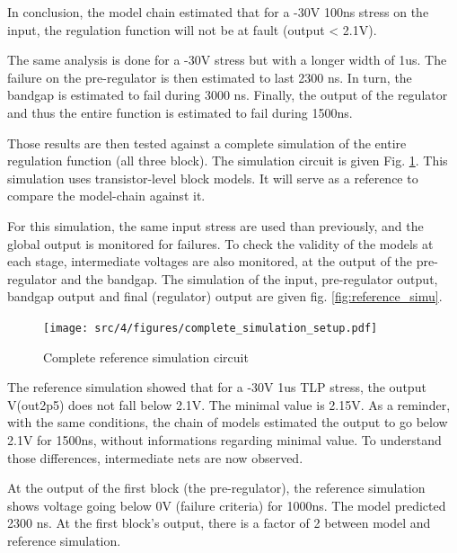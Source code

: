 In conclusion, the model chain estimated that for a -30V 100ns stress on the input, the regulation function will not be at fault (output < 2.1V).

The same analysis is done for a -30V stress but with a longer width of 1us.
The failure on the pre-regulator is then estimated to last 2300 ns.
In turn, the bandgap is estimated to fail during 3000 ns.
Finally, the output of the regulator and thus the entire function is estimated to fail during 1500ns.

Those results are then tested against a complete simulation of the entire regulation function (all three block).
The simulation circuit is given Fig. \ref{fig:reference_simu_circuit}.
This simulation uses transistor-level block models.
It will serve as a reference to compare the model-chain against it.

For this simulation, the same input stress are used than previously, and the global output is monitored for failures.
To check the validity of the models at each stage, intermediate voltages are also monitored, at the output of the pre-regulator and the bandgap.
The simulation of the input, pre-regulator output, bandgap output and final (regulator) output are given fig. \ref{fig:reference_simu}.

\begin{figure}[!htbp]
  \centering
  \texttt{[image: src/4/figures/complete\_simulation\_setup.pdf]}
  \caption{Complete reference simulation circuit}
  \label{fig:reference_simu_circuit}
\end{figure}

The reference simulation showed that for a -30V 1us TLP stress, the output V(out2p5) does not fall below 2.1V.
The minimal value is 2.15V.
As a reminder, with the same conditions, the chain of models estimated the output to go below 2.1V for 1500ns, without informations regarding minimal value.
To understand those differences, intermediate nets are now observed.

At the output of the first block (the pre-regulator), the reference simulation shows voltage going below 0V (failure criteria) for 1000ns.
The model predicted 2300 ns.
At the first block's output, there is a factor of 2 between model and reference simulation.

